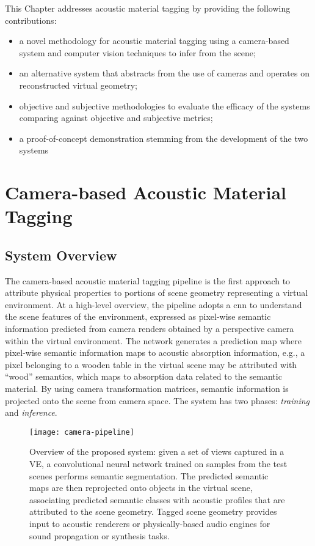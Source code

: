 This Chapter addresses acoustic material tagging by providing the following contributions:
\begin{itemize}
    \item a novel methodology for acoustic material tagging using a camera-based system and computer vision techniques to infer from the scene;
    \item an alternative system that abstracts from the use of cameras and operates on reconstructed virtual geometry;
    \item objective and subjective methodologies to evaluate the efficacy of the systems comparing against objective and subjective metrics;
    \item a proof-of-concept demonstration stemming from the development of the two systems
\end{itemize}


\section{Camera-based Acoustic Material Tagging}\label{sec:camera-tagging}
\subsection{System Overview}
The camera-based acoustic material tagging pipeline is the first approach to attribute physical properties to portions of scene geometry representing a virtual environment. At a high-level overview, the pipeline adopts a \acrfull{cnn} to understand the scene features of the environment, expressed as pixel-wise semantic information predicted from camera renders obtained by a perspective camera within the virtual environment. The network generates a prediction map where pixel-wise semantic information maps to acoustic absorption information, e.g., a pixel belonging to a wooden table in the virtual scene may be attributed with ``wood'' semantics, which maps to absorption data related to the semantic material. By using camera transformation matrices, semantic information is projected onto the scene from camera space. The system has two phases: \emph{training} and \emph{inference}.
\begin{figure}[htbp]
    \centering
    \texttt{[image: camera-pipeline]}
    \caption[Camera-based acoustic material tagging system overview]{Overview of the proposed system: given a set of views captured in a VE, a convolutional neural network trained on samples from the test scenes performs semantic segmentation. The predicted semantic maps are then reprojected onto objects in the virtual scene, associating predicted semantic classes with acoustic profiles that are attributed to the scene geometry. Tagged scene geometry provides input to acoustic renderers or physically-based audio engines for sound propagation or synthesis tasks.}
    \label{fig:cog-pipeline}
\end{figure}

